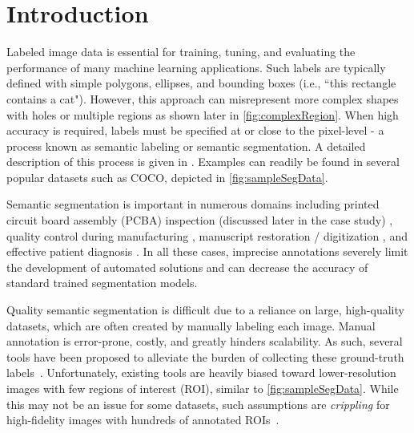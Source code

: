 \section{Introduction}
Labeled image data is essential for training, tuning, and evaluating the performance of many machine learning applications.
Such labels are typically defined with simple polygons, ellipses, and bounding boxes (i.e., ``this rectangle contains a cat").
However, this approach can misrepresent more complex shapes with holes or multiple regions as shown later in \autoref{fig:complexRegion}.
When high accuracy is required, labels must be specified at or close to the pixel-level - a process known as semantic labeling or semantic segmentation.
A detailed description of this process is given in \cite{chengSurveyAnalysisAutomatic2018}.
Examples can readily be found in several popular datasets such as COCO, depicted in \autoref{fig:sampleSegData}.

\makeSampleSegFig

Semantic segmentation is important in numerous domains including printed circuit board assembly (PCBA) inspection (discussed later in the case study) \citep{paradis2020color,azhaganReviewAutomaticBill2019}, quality control during manufacturing \citep{fergusonDetectionSegmentationManufacturing2018,anagnostopoulosComputerVisionApproach2001,anagnostopoulosHighPerformanceComputing2002}, manuscript restoration / digitization \citep{gatosSegmentationfreeRecognitionTechnique2004,kesimanNewSchemeText2016,jainTextSegmentationUsing1992,taxtSegmentationDocumentImages1989,fujisawaSegmentationMethodsCharacter1992}, and effective patient diagnosis \citep{seifertSemanticAnnotationMedical2010,rajchlDeepCutObjectSegmentation2017,yushkevichUserguided3DActive2006,iakovidisRatsnakeVersatileImage2014}.
In all these cases, imprecise annotations severely limit the development of automated solutions and can decrease the accuracy of standard trained segmentation models.

Quality semantic segmentation is difficult due to a reliance on large, high-quality datasets, which are often created by manually labeling each image.
Manual annotation is error-prone, costly, and greatly hinders scalability.
As such, several tools have been proposed to alleviate the burden of collecting these ground-truth labels~\citep{BestImageAnnotation}.
Unfortunately, existing tools are heavily biased toward lower-resolution images with few regions of interest (ROI), similar to \autoref{fig:sampleSegData}.
While this may not be an issue for some datasets, such assumptions are \emph{crippling} for high-fidelity images with hundreds of annotated ROIs~\citep{Ladicky_whatWhereCombiningCRFs,Wang_multiLabelImageAnnotation}.

